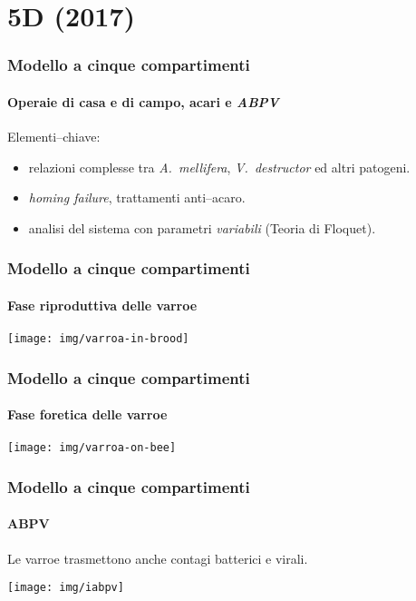 \documentclass[]{beamer}
\begin{document}
\section{5D (2017)} %


\begin{frame}
    \frametitle{Modello a cinque compartimenti}
    \framesubtitle{Operaie di casa e di campo, acari e \emph{ABPV}}

    \cite{ratti2017}

    \vspace{1em}
    Elementi--chiave:
    \begin{itemize}
        \item \pause relazioni complesse tra \emph{A.~mellifera}, \emph{V.~destructor} ed altri patogeni.
        \item \pause \emph{homing failure}, trattamenti anti--acaro.
        \item \pause analisi del sistema con parametri \emph{variabili} \pause (Teoria di Floquet).
    \end{itemize}
\end{frame}

\begin{frame}
    \frametitle{Modello a cinque compartimenti}
    \framesubtitle{Fase riproduttiva delle varroe}

    \begin{center}
        \texttt{[image: img/varroa-in-brood]}
    \end{center}
\end{frame}

\begin{frame}
    \frametitle{Modello a cinque compartimenti}
    \framesubtitle{Fase foretica delle varroe}

    \begin{center}
        \texttt{[image: img/varroa-on-bee]}
    \end{center}
\end{frame}

\begin{frame}
    \frametitle{Modello a cinque compartimenti}
    \framesubtitle{ABPV}

    Le varroe trasmettono anche contagi batterici e virali.

    \pause
    \begin{center}
        \texttt{[image: img/iabpv]}
    \end{center}
\end{frame}
\end{document}
